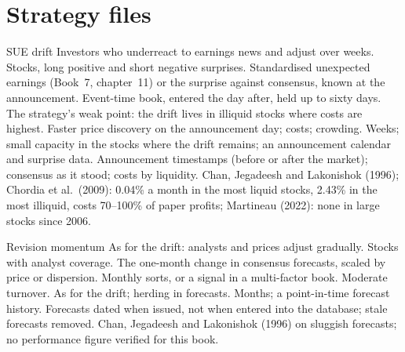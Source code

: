 \section{Strategy files}

\begin{strategyfile}{SUE drift}\label{strat:s1:earnings:sue}
 Investors who underreact to earnings news and adjust over weeks.
 Stocks, long positive and short negative surprises.
 Standardised unexpected earnings (Book~7, chapter~11) or the surprise against consensus, known at the announcement.
 Event-time book, entered the day after, held up to sixty days.
 The strategy's weak point: the drift lives in illiquid stocks where costs are highest.
 Faster price discovery on the announcement day; costs; crowding.
 Weeks; small capacity in the stocks where the drift remains; an announcement calendar and surprise data.
 Announcement timestamps (before or after the market); consensus as it stood; costs by liquidity.
 Chan, Jegadeesh and Lakonishok (1996); Chordia et al.\ (2009): 0.04\% a month in the most liquid stocks, 2.43\% in the most illiquid, costs
70--100\% of paper profits; Martineau (2022): none in large stocks since 2006.
\end{strategyfile}

\begin{strategyfile}{Revision momentum}\label{strat:s1:earnings:revision}
 As for the drift: analysts and prices adjust gradually.
 Stocks with analyst coverage.
 The one-month change in consensus forecasts, scaled by price or dispersion.
 Monthly sorts, or a signal in a multi-factor book.
 Moderate turnover.
 As for the drift; herding in forecasts.
 Months; a point-in-time forecast history.
 Forecasts dated when issued, not when entered into the database; stale forecasts removed.
 Chan, Jegadeesh and Lakonishok (1996) on sluggish forecasts; no performance figure verified for this book.
\end{strategyfile}

